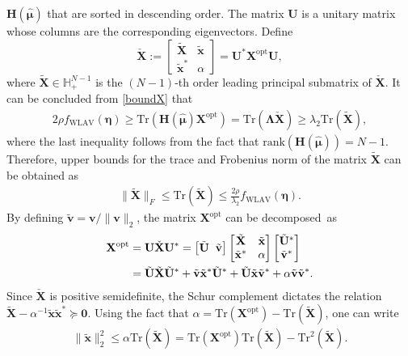 \documentclass[journal,twoside]{IEEEtran}
\newcommand{\Tr}{\mathrm{Tr}}
\newcommand{\bv}{\mathbf{v}}
\newcommand{\bH}{\mathbf{H}}
\newcommand{\bU}{\mathbf{U}}
\newcommand{\bX}{\mathbf{X}}
\newcommand{\tbU}{\tilde{\mathbf{U}}}
\newcommand{\bLambda}{\bm{\Lambda}}
\newcommand{\tbX}{\tilde{\mathbf{X}}}
\newcommand{\tbx}{\tilde{\mathbf{x}}}
\newcommand{\tbv}{\tilde{\mathbf{v}}}
\begin{document}
$\bH(\hat{\boldsymbol{\mu}})$ that are sorted in descending order. The matrix $\bU$ is a unitary matrix whose columns are the corresponding eigenvectors.
Define
\begin{equation}
\check{\bX}:=
\begin{bmatrix}
\tbX     &\tbx  \\
\tbx^{*}   &\alpha
\end{bmatrix} = \bU^{*}{\bX}^{\mathrm{opt}}\bU,
\end{equation}
where $\tbX \in \mathbb{H}_{+}^{N-1}$ is the $(N\!-\!1)$-th order leading principal submatrix of $\check{\bX}$.
It can be concluded from \eqref{boundX} that
\begin{align*}
 2\rho f_{\mathrm{WLAV}}(\boldsymbol{\eta}) \geq
\Tr(\bH(\hat{\boldsymbol{\mu}}){\bX}^{\mathrm{opt}}) =  \Tr(\bLambda \check{\bX}) \geq \lambda_2\Tr(\tbX),
\end{align*}
where the last inequality follows from the fact that $\mathrm{rank}(\mathbf{H}(\hat{\boldsymbol{\mu}}))=N-1$.
Therefore, upper bounds for the trace and Frobenius norm of the matrix $\tbX$ can be obtained as
\begin{align*}
\|\tbX\|_F \leq \Tr(\tbX) \leq \frac{2\rho}{\lambda_2} f_{\mathrm{WLAV}}(\boldsymbol{\eta}).
\end{align*}
By defining $\tbv = {\bv}/{\|\bv\|_2}$, the matrix ${\bX}^{\mathrm{opt}}$ can be decomposed~as
\begin{align}\label{decompXhat}
{\bX}^{\mathrm{opt}} &=  \bU\check{\bX} \bU^{*} \notag =
\begin{bmatrix}
\tbU\;\;     \tbv
\end{bmatrix}
\begin{bmatrix}
\tbX     &\tbx  \\
\tbx^{*}   &\alpha
\end{bmatrix}
\begin{bmatrix}
\tbU^{*}  \\
\tbv^{*}
\end{bmatrix} \notag \\
&= \tbU\tbX\tbU^{*} + \tbv \tbx^{*}\tbU^{*} + \tbU\tbx\tbv^{*} + \alpha\tbv\tbv^{*}.
\end{align}
Since $\check{\bX}$ is positive semidefinite, the Schur complement dictates the relation
$\tbX - \alpha^{-1}\tbx\tbx^{*}\succeq \mathbf{0}$. Using the fact that
$\alpha = \Tr({\bX}^{\mathrm{opt}}) - \Tr(\tbX)$, one can write
\begin{align}\label{bound:xn}
\|\tbx\|_2^2 \leq \alpha\Tr(\tbX) = \Tr({\bX}^{\mathrm{opt}})\Tr(\tbX) - \Tr^2(\tbX).
\end{align}
\end{document}
